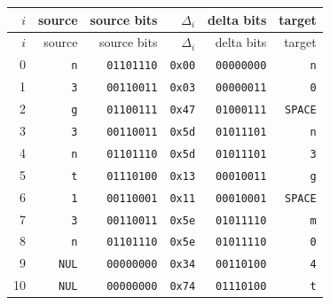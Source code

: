 \begin{longtable}{rrrrrr}
\toprule
$i$ & source & source bits & $\Delta_i$ & delta bits & target \\
\midrule
\endfirsthead
\toprule
$i$ & source & source bits & $\Delta_i$ & delta bits & target \\
\midrule
\endhead
0 & \texttt{n} & \texttt{01101110} & \texttt{0x00} & \texttt{00000000} & \texttt{n} \\
1 & \texttt{3} & \texttt{00110011} & \texttt{0x03} & \texttt{00000011} & \texttt{0} \\
2 & \texttt{g} & \texttt{01100111} & \texttt{0x47} & \texttt{01000111} & \texttt{SPACE} \\
3 & \texttt{3} & \texttt{00110011} & \texttt{0x5d} & \texttt{01011101} & \texttt{n} \\
4 & \texttt{n} & \texttt{01101110} & \texttt{0x5d} & \texttt{01011101} & \texttt{3} \\
5 & \texttt{t} & \texttt{01110100} & \texttt{0x13} & \texttt{00010011} & \texttt{g} \\
6 & \texttt{1} & \texttt{00110001} & \texttt{0x11} & \texttt{00010001} & \texttt{SPACE} \\
7 & \texttt{3} & \texttt{00110011} & \texttt{0x5e} & \texttt{01011110} & \texttt{m} \\
8 & \texttt{n} & \texttt{01101110} & \texttt{0x5e} & \texttt{01011110} & \texttt{0} \\
9 & \texttt{NUL} & \texttt{00000000} & \texttt{0x34} & \texttt{00110100} & \texttt{4} \\
10 & \texttt{NUL} & \texttt{00000000} & \texttt{0x74} & \texttt{01110100} & \texttt{t} \\
\bottomrule
\end{longtable}
